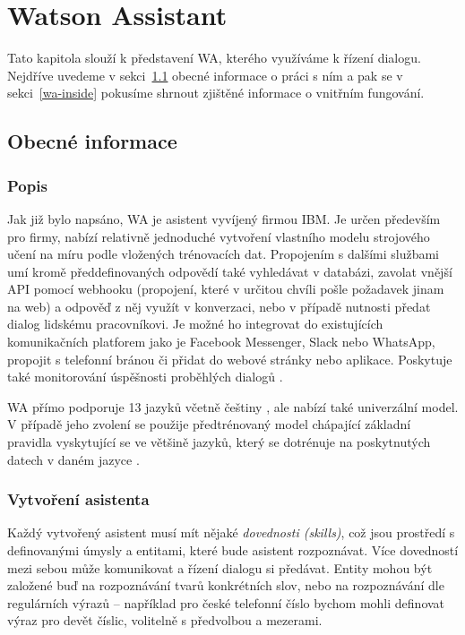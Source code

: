 \chapter{Watson Assistant}\label{chapter-wa}

Tato kapitola slouží k představení WA,
kterého využíváme k řízení dialogu.
Nejdříve uvedeme v sekci~\ref{wa-common} obecné informace
o práci s ním a pak se v sekci~\ref{wa-inside} pokusíme shrnout zjištěné
informace o vnitřním fungování.

\section{Obecné informace}\label{wa-common}

\subsection{Popis}

Jak již bylo napsáno, WA je asistent vyvíjený firmou IBM.
Je určen především pro firmy, nabízí relativně jednoduché vytvoření
vlastního modelu strojového učení na míru podle vložených trénovacích
dat. Propojením s dalšími službami umí kromě předdefinovaných odpovědí
také vyhledávat v databázi, zavolat vnější API pomocí webhooku (propojení,
které v určitou chvíli pošle požadavek jinam na web) a odpověď
z něj využít v konverzaci, nebo v případě nutnosti předat dialog lidskému
pracovníkovi. Je možné ho integrovat do existujících komunikačních platforem
jako je Facebook Messenger, Slack nebo WhatsApp, propojit s telefonní
bránou či přidat do webové stránky nebo aplikace. Poskytuje také monitorování
úspěšnosti proběhlých dialogů \citep{wa_about}.

WA přímo podporuje 13 jazyků včetně
češtiny \citep{wa_languages}, ale nabízí také univerzální model. V případě
jeho zvolení se použije předtrénovaný model chápající základní pravidla
vyskytující se ve většině jazyků, který se dotrénuje na poskytnutých
datech v daném jazyce \citep{wa_universal_model}.

\subsection{Vytvoření asistenta}\label{wa-create}

Každý vytvořený asistent musí mít nějaké \textit{dovednosti (skills)},
což jsou prostředí s definovanými úmysly a entitami, které bude asistent
rozpoznávat. Více dovedností mezi sebou může komunikovat
a řízení dialogu si předávat. Entity mohou být založené buď na rozpoznávání tvarů
konkrétních slov, nebo na rozpoznávání dle regulárních výrazů -- například
pro české telefonní
číslo bychom mohli definovat výraz pro devět číslic, volitelně s
předvolbou a mezerami.

